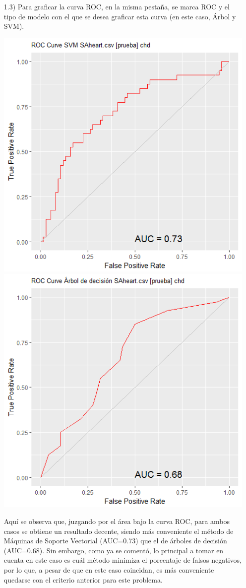 \documentclass[11pt,a4paper]{report}
\begin{document}
\begin{itemize}
\item[1.3)] Para graficar la curva ROC, en la misma pestaña, se marca ROC y el tipo de modelo con el que se desea graficar esta curva (en este caso, Árbol y SVM).
\begin{center}
\includegraphics[scale=0.8]{SVM1.png}\\
\includegraphics[scale=0.8]{arbold.png}
\end{center}
Aquí se observa que, juzgando por el área bajo la curva ROC, para ambos casos se obtiene un resultado decente, siendo más conveniente el método de Máquinas de Soporte Vectorial (AUC=0.73) que el de árboles de decisión (AUC=0.68). Sin embargo, como ya se comentó, lo principal a tomar en cuenta en este caso es cuál método minimiza el porcentaje de falsos negativos, por lo que, a pesar de que en este caso coincidan, es más conveniente quedarse con el criterio anterior para este problema.


\end{itemize}
\end{document}
